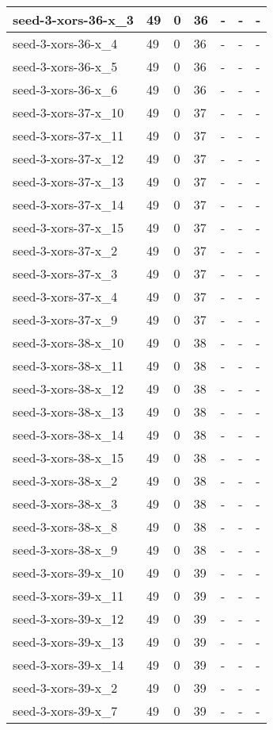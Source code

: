 \begin{scriptsize}
\begin{longtable}{|p{5cm}|l|l|l|l|l|l|}
seed-3-xors-36-x\_3&49&0&36&-&-&- \\ \hline 
seed-3-xors-36-x\_4&49&0&36&-&-&- \\ \hline 
seed-3-xors-36-x\_5&49&0&36&-&-&- \\ \hline 
seed-3-xors-36-x\_6&49&0&36&-&-&- \\ \hline 
seed-3-xors-37-x\_10&49&0&37&-&-&- \\ \hline 
seed-3-xors-37-x\_11&49&0&37&-&-&- \\ \hline 
seed-3-xors-37-x\_12&49&0&37&-&-&- \\ \hline 
seed-3-xors-37-x\_13&49&0&37&-&-&- \\ \hline 
seed-3-xors-37-x\_14&49&0&37&-&-&- \\ \hline 
seed-3-xors-37-x\_15&49&0&37&-&-&- \\ \hline 
seed-3-xors-37-x\_2&49&0&37&-&-&- \\ \hline 
seed-3-xors-37-x\_3&49&0&37&-&-&- \\ \hline 
seed-3-xors-37-x\_4&49&0&37&-&-&- \\ \hline 
seed-3-xors-37-x\_9&49&0&37&-&-&- \\ \hline 
seed-3-xors-38-x\_10&49&0&38&-&-&- \\ \hline 
seed-3-xors-38-x\_11&49&0&38&-&-&- \\ \hline 
seed-3-xors-38-x\_12&49&0&38&-&-&- \\ \hline 
seed-3-xors-38-x\_13&49&0&38&-&-&- \\ \hline 
seed-3-xors-38-x\_14&49&0&38&-&-&- \\ \hline 
seed-3-xors-38-x\_15&49&0&38&-&-&- \\ \hline 
seed-3-xors-38-x\_2&49&0&38&-&-&- \\ \hline 
seed-3-xors-38-x\_3&49&0&38&-&-&- \\ \hline 
seed-3-xors-38-x\_8&49&0&38&-&-&- \\ \hline 
seed-3-xors-38-x\_9&49&0&38&-&-&- \\ \hline 
seed-3-xors-39-x\_10&49&0&39&-&-&- \\ \hline 
seed-3-xors-39-x\_11&49&0&39&-&-&- \\ \hline 
seed-3-xors-39-x\_12&49&0&39&-&-&- \\ \hline 
seed-3-xors-39-x\_13&49&0&39&-&-&- \\ \hline 
seed-3-xors-39-x\_14&49&0&39&-&-&- \\ \hline 
seed-3-xors-39-x\_2&49&0&39&-&-&- \\ \hline 
seed-3-xors-39-x\_7&49&0&39&-&-&- \\ \hline 

\end{longtable}
\end{scriptsize}
